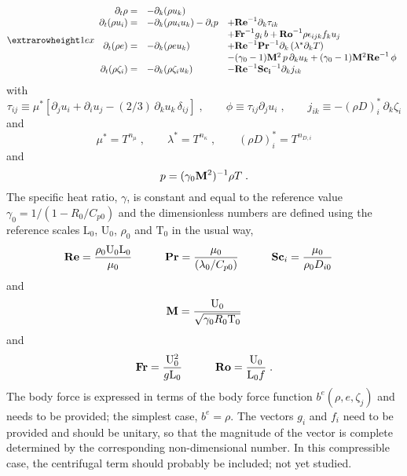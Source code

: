 \begin{equation}
\setlength{\extrarowheight}{1ex}
\begin{array}{rll}
  \partial_t \rho =&
  -\partial_k (\rho u_k)  & \\
  \partial_t (\rho u_i) =& 
  -\partial_k (\rho u_i u_k )- \partial_i p &
  +\mathrm{\bf Re}^{-1}\partial_k \tau_{ik}\\
  & & +\mathrm{\bf Fr}^{-1} g_i\,b+\mathrm{\bf Ro}^{-1}\rho\epsilon_{ijk} f_ku_j  \\
  \partial_t (\rho e) =& 
  -\partial_k (\rho e u_k ) &
  +\mathrm{\bf Re}^{-1}\mathrm{\bf Pr}^{-1} \partial_k \left(\lambda^{*} \partial_k T\right) \\
  & &-(\gamma_0-1)\mathrm{\bf M}^2\,p\, \partial_k u_k  + (\gamma_0-1)\mathrm{\bf M}^2\mathrm{\bf Re}^{-1}\,\phi \\
  \partial_t (\rho \zeta_i)=&
  -\partial_k (\rho \zeta_i u_k) &
  - \mathrm{\bf Re}^{-1}\mathrm{\bf Sc_i}^{-1} \partial_k j_{ik}
\end{array}
\end{equation}
with
\begin{equation}
  \tau_{ij} \equiv  \mu^*\left[\partial_j u_i +  \partial_i u_j - 
  (2/3)\, \partial_k u_k\,\delta_{ij}\right]\;,\qquad
  \phi \equiv \tau_{ij} \partial_j u_i\;,\qquad
  j_{ik}  \equiv -(\rho D)_i^{*}\, \partial_k \zeta_i
\end{equation}
and
\begin{equation}
  \mu^{*} =  T^{n_\mu}\;,\qquad \lambda^{*} = T^{n_\kappa} \;,\qquad (\rho D)_i^{*}  =  T^{n_{D,i}}
\end{equation}
and
\begin{equation}
  p  = (\gamma_0 \mathrm{\bf M}^2)^{-1}\rho T \;.
  \label{eq:state}
\end{equation}
The specific heat ratio, $\gamma$, is constant and equal to the reference value
$\gamma_0=1/(1-R_0/C_{p0})$ and the dimensionless numbers are defined using the
reference scales $\mathrm{L}_0$, $\mathrm{U}_0$, $\rho_0$
and $\mathrm{T}_0$ in the usual way,
\begin{alignat*}{3}
  \mathrm{\bf Re} & = \frac{\rho_0 \mathrm{U}_0 \mathrm{L}_0}{\mu_0} & \qquad 
  \mathrm{\bf Pr} & = \frac{\mu_0}{(\lambda_0/C_{p0})} & \qquad
  \mathrm{\bf Sc}_i & = \frac{\mu_0}{\rho_0 D_{i0}} 
\end{alignat*}
and
\begin{equation*}
  \mathrm{\bf M}  = \frac{\mathrm{U}_0}{\sqrt{\gamma_0 R_0 \mathrm{T}_0}} 
\end{equation*}
and
\begin{alignat*}{2}
\mathrm{\bf Fr} & = \frac{\mathrm{U}_0^2}{g\mathrm{L}_0} & \qquad \mathrm{\bf
  Ro} = \frac{\mathrm{U}_0}{\mathrm{L}_0f} \;.
\end{alignat*}
The body force is expressed in terms of the body force function
$b^e(\rho,e,\zeta_j)$ and needs to be provided; the simplest case, $b^e=\rho$. The
vectors $g_i$ and $f_i$ need to be provided and should be unitary, so that the
magnitude of the vector is complete determined by the corresponding
non-dimensional number. In this compressible case, the centrifugal term should
probably be included; not yet studied.

